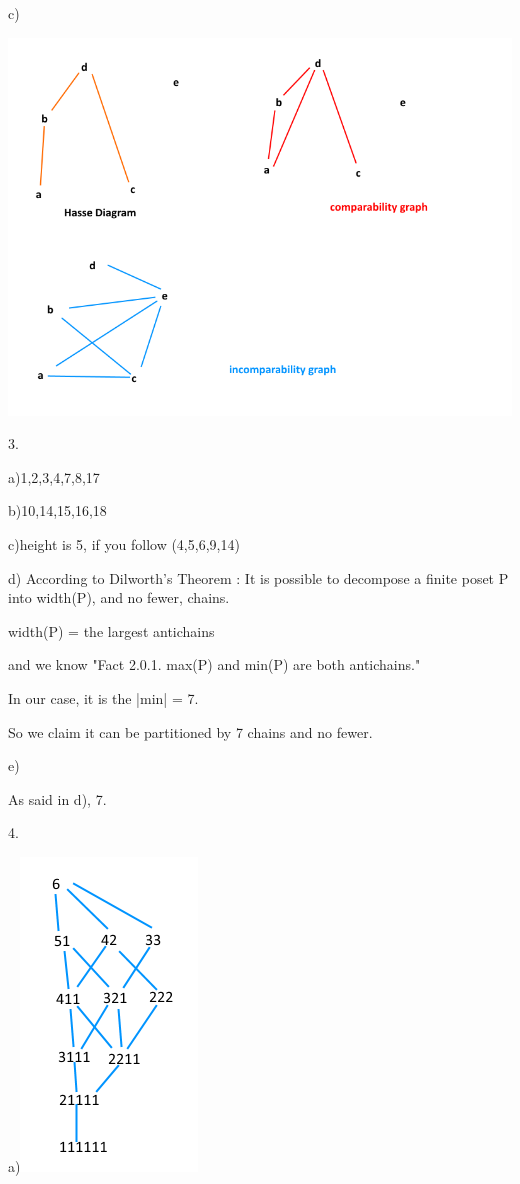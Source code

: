 \documentclass{article}
\begin{document}
c)

\includegraphics[scale=0.6]{HW12_3.png}

3.

a){1,2,3,4,7,8,17}

b){10,14,15,16,18}

c)height is 5, if you follow (4,5,6,9,14)

d)
According to Dilworth’s Theorem : It is possible to decompose a finite poset P into
width(P), and no fewer, chains.

width(P) = the largest antichains

and we know "Fact 2.0.1. max(P) and min(P) are both antichains."

In our case, it is the |min| = 7.

So we claim it can be partitioned by 7 chains and no fewer.

e)

As said in d), 7.

4.

a)\includegraphics[scale=0.5]{HW12_4.png}
\end{document}
